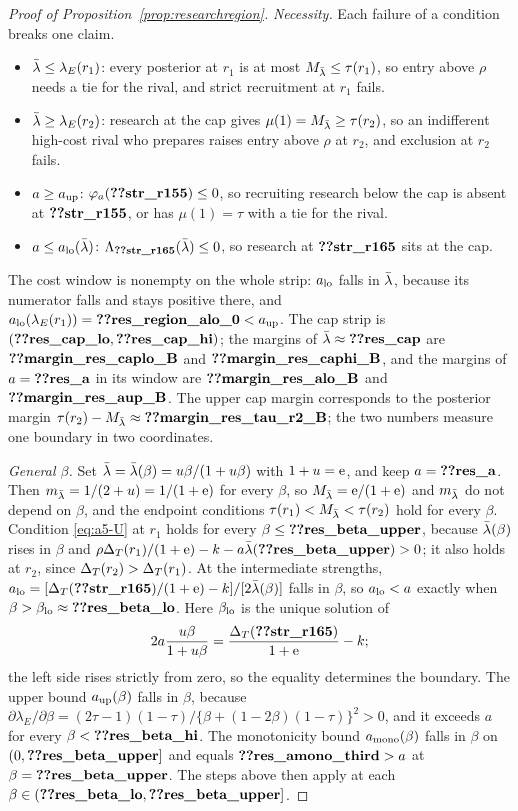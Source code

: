 \begin{proof}[Proof of Proposition~\ref{prop:researchregion}]
\emph{Necessity.} Each failure of a condition breaks one claim.
\begin{itemize}[leftmargin=2em]
\item \(\bar\lambda\le\lambda_E(r_1)\): every posterior at \(r_1\) is at most \(M_{\bar\lambda}\le\tau(r_1)\), so entry above \(\rho\)
needs a tie for the rival, and strict recruitment at \(r_1\) fails.
\item \(\bar\lambda\ge\lambda_E(r_2)\): research at the cap gives \(\mu(1)=M_{\bar\lambda}\ge\tau(r_2)\), so an indifferent high-cost rival who prepares raises entry above
\(\rho\) at \(r_2\), and exclusion at \(r_2\) fails.
\item \(a\ge a_{\rm up}\): \(\varphi_a(\reg{str_r155})\le0\), so recruiting research below the cap is absent at \(\reg{str_r155}\), or has
\(\mu(1)=\tau\) with a tie for the rival.
\item \(a\le a_{\rm lo}(\bar\lambda)\): \(\Lambda_{\reg{str_r165}}(\lb)\le0\), so research at \(\reg{str_r165}\) sits at the cap.
\end{itemize}
The cost window is nonempty on the whole strip: \(a_{\rm lo}\) falls in \(\bar\lambda\), because its numerator falls and stays
positive there, and \(a_{\rm lo}(\lambda_E(r_1))=\reg{res_region_alo_0}<a_{\rm up}\). The cap strip is
\((\reg{res_cap_lo},\reg{res_cap_hi})\); the margins of \(\lb\approx\reg{res_cap}\) are \(\reg{margin_res_caplo_B}\) and
\(\reg{margin_res_caphi_B}\), and the margins of \(a=\reg{res_a}\) in its window are \(\reg{margin_res_alo_B}\) and
\(\reg{margin_res_aup_B}\). The upper cap margin corresponds to the posterior margin \(\tau(r_2)-M_{\lb}\approx
\reg{margin_res_tau_r2_B}\); the two numbers measure one boundary in two coordinates.

\emph{General \(\beta\).} Set \(\bar\lambda=\bar\lambda(\beta)=u\beta/(1+u\beta)\) with \(1+u=\mathrm{e}\), and keep \(a=\reg{res_a}\).
Then \(m_{\bar\lambda}=1/(2+u)=1/(1+\mathrm{e})\) for every \(\beta\), so \(M_{\bar\lambda}=\mathrm{e}/(1+\mathrm{e})\) and \(m_{\bar\lambda}\) do not depend on \(\beta\),
and the endpoint conditions \(\tau(r_1)<M_{\bar\lambda}<\tau(r_2)\) hold for every \(\beta\). Condition \eqref{eq:a5-U} at
\(r_1\) holds for every \(\beta\le\reg{res_beta_upper}\), because \(\bar\lambda(\beta)\) rises in \(\beta\) and
\(\rho\DT(r_1)/(1+\eu)-k-a\lb(\reg{res_beta_upper})>0\); it also holds at \(r_2\), since \(\Delta_T(r_2)>\Delta_T(r_1)\).
At the intermediate strengths,
\(a_{\rm lo}=[\DT(\reg{str_r165})/(1+\eu)-k]/[2\lb(\beta)]\) falls in \(\beta\), so \(a_{\rm lo}<a\) exactly when
\(\beta>\beta_{\rm lo}\approx\reg{res_beta_lo}\). Here \(\beta_{\rm lo}\) is the unique solution of
\[
 2a\frac{u\beta}{1+u\beta}=\frac{\DT(\reg{str_r165})}{1+\eu}-k;
\]
the left side rises strictly from zero, so the equality determines the boundary.
The upper bound \(a_{\rm up}(\beta)\) falls in \(\beta\), because
\(\partial\lambda_E/\partial\beta=(2\tau-1)(1-\tau)/\{\beta+(1-2\beta)(1-\tau)\}^2>0\), and it exceeds \(a\) for every
\(\beta<\reg{res_beta_hi}\). The monotonicity bound \(a_{\rm mono}(\beta)\) falls in \(\beta\) on \((0,\reg{res_beta_upper}]\) and equals
\(\reg{res_amono_third}>a\) at \(\beta=\reg{res_beta_upper}\). The steps above then apply at each \(\beta\in(\reg{res_beta_lo},\reg{res_beta_upper}]\).

\end{proof}

